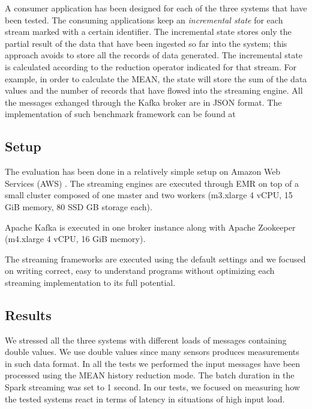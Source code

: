 A consumer application has been designed for each of the three systems that have been tested. The consuming applications keep an \emph{incremental state} for each stream marked with a certain identifier. The incremental state stores only the partial result of the data that have been ingested so far into the system; this approach avoids to store all the records of data generated. The incremental state is calculated according to the reduction operator indicated for that stream. For example, in order to calculate the MEAN, the state will store the sum of the data values and the number of records that have flowed into the streaming engine. All the messages exhanged through the Kafka broker are in JSON format. The implementation of such benchmark framework can be found at \cite{streamingbenchmarkonline}

\subsection{Setup}
The evaluation has been done in a relatively simple setup on Amazon Web Services (AWS) \cite{amazonwebservicesonline}. The streaming engines are executed through EMR \cite{amazonemronline} on top of a small cluster composed of one master and two workers (m3.xlarge 4 vCPU, 15 GiB memory, 80 SSD GB storage each).

Apache Kafka is executed in one broker instance along with Apache Zookeeper (m4.xlarge 4 vCPU, 16 GiB memory).

The streaming frameworks are executed using the default settings and we focused on writing correct, easy to understand programs without optimizing each streaming implementation to its full potential.

\subsection{Results}
We stressed all the three systems with different loads of messages containing double values. We use double values since many sensors produces measurements in such data format. In all the tests we performed the input messages have been processed using the MEAN history reduction mode. The batch duration in the Spark streaming was set to 1 second. In our tests, we focused on measuring how the tested systems react in terms of latency in situations of high input load.

